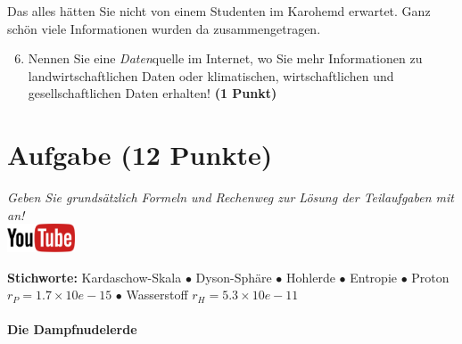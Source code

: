 \documentclass[a4paper, 9pt]{scrartcl}\usepackage[]{graphicx}\usepackage[]{xcolor}
\begin{document}
Das alles hätten Sie nicht von einem Studenten im Karohemd erwartet. Ganz schön viele Informationen wurden da zusammengetragen.

\begin{enumerate}
  \setcounter{enumi}{5}  
  \item Nennen Sie eine \textit{Daten}quelle im Internet, wo Sie mehr Informationen zu landwirtschaftlichen Daten oder klimatischen, wirtschaftlichen und gesellschaftlichen Daten erhalten! \textbf{(1 Punkt)}
\end{enumerate} 
\clearpage

\section{Aufgabe \hfill (12 Punkte)}

\textit{Geben Sie grunds{\"a}tzlich Formeln und Rechenweg zur L{\"o}sung der
  Teilaufgaben mit an!} \\[1Ex]

\hfill\href{https://youtu.be/WZSxntiNF8s}{\includegraphics[width = 2cm]{img/youtube}} %
\hspace{2Ex}

{\tiny\textbf{Stichworte:} Kardaschow-Skala $\bullet$ Dyson-Sphäre $\bullet$ Hohlerde $\bullet$ Entropie $\bullet$ Proton $r_P = 1.7 \times 10e-15$ $\bullet$ Wasserstoff $r_H = 5.3\times 10e-11$}

\paragraph{Die Dampfnudelerde}
\end{document}
